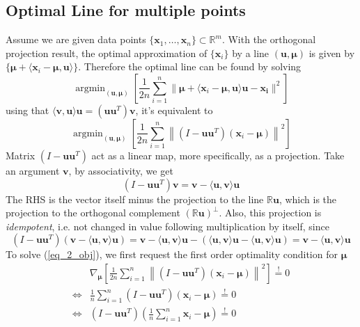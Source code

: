 \documentclass[../book-template.tex]{subfiles}
\begin{document}
\subsection{Optimal Line for multiple points}
Assume we are given data points $\{\bm{x}_1,\dots,\bm{x}_n\}\subset \mathbb{R}^m$. With the orthogonal projection result, the optimal approximation of $\{\bm{x}_i\}$ by a line $(\bm{u},\bm{\mu})$ is given by $\{\bm{\mu} + \langle \bm{x}_i-\bm{\mu},\bm{u} \rangle\}$. Therefore the optimal line can be found by solving
\begin{equation*}
    \mathop{\arg\min}_{(\bm{u},\bm{\mu})} \left[ \frac{1}{2n}\sum_{i=1}^n \| \bm{\mu}+ \langle \bm{x}_i-\bm{\mu},\bm{u\rangle\bm{u} - \bm{x}_i} \|^2\right]
\end{equation*}
using that $\langle\bm{v},\bm{u}\rangle\bm{u}=(\bm{u}\bm{u}^T)\bm{v}$, it's equivalent to
\begin{equation}\label{eq_2_obj}
    \mathop{\arg\min}_{(\bm{u},\bm{\mu})} \left[ \frac{1}{2n}\sum_{i=1}^n \left\| \left(I-\bm{u}\bm{u}^T \right)(\bm{x}_i-\bm{\mu}) \right\| ^2\right]
\end{equation}
Matrix $\left(I-\bm{u}\bm{u}^T \right)$ act as a linear map, more specifically, as a projection. Take an argument $\bm{v}$, by associativity, we get
\begin{equation*}
    \left(I-\bm{u}\bm{u}^T \right)\bm{v} = \bm{v} - \langle \bm{u}, \bm{v}\rangle\bm{u}
\end{equation*}
The RHS is the vector itself minus the projection to the line $\mathbb{R}\bm{u}$, which is the projection to the orthogonal complement $(\mathbb{R}\bm{u})^{\bot}$. Also, this projection is \emph{idempotent}, i.e. not changed in value following multiplication by itself, since
\begin{equation*}
     \left(I-\bm{u}\bm{u}^T \right)( \bm{v} - \langle \bm{u}, \bm{v}\rangle\bm{u}) =  \bm{v} - \langle \bm{u}, \bm{v}\rangle\bm{u} - ( \langle \bm{u}, \bm{v}\rangle\bm{u} -  \langle \bm{u}, \bm{v}\rangle\bm{u}) =  \bm{v} - \langle \bm{u}, \bm{v}\rangle\bm{u}
\end{equation*}
To solve (\ref{eq_2_obj}), we first request the first order optimality condition for $\bm{\mu}$
\begin{align*}
    &\nabla_{\bm{\mu}} \left[ \frac{1}{2n}\sum_{i=1}^n \left\| \left(I-\bm{u}\bm{u}^T \right)(\bm{x}_i-\bm{\mu}) \right\| ^2\right] \overset{!}{=} 0\\
    \Longleftrightarrow &  \frac{1}{n}\sum_{i=1}^n  \left(I-\bm{u}\bm{u}^T \right)(\bm{x}_i-\bm{\mu}) \overset{!}{=} 0\\
    \Longleftrightarrow & \left(I-\bm{u}\bm{u}^T \right)(\frac{1}{n}\sum_{i=1}^n\bm{x}_i-\bm{\mu})\overset{!}{=} 0
\end{align*}
\end{document}
